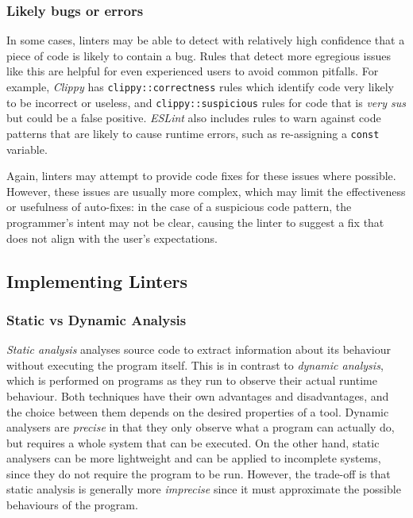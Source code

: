 \documentclass[../../main.tex]{subfiles}
\begin{document}
\subsubsection{Likely bugs or errors}
In some cases, linters may be able to detect with relatively high confidence that a piece of code is likely to contain a bug.
Rules that detect more egregious issues like this are helpful for even experienced users to avoid common pitfalls.
For example, \emph{Clippy} has \texttt{clippy::correctness} rules which identify code very likely to be incorrect or useless, and \texttt{clippy::suspicious} rules for code that is \emph{very sus} but could be a false positive.
\emph{ESLint} also includes rules to warn against code patterns that are likely to cause runtime errors, such as re-assigning a \texttt{const} variable.

Again, linters may attempt to provide code fixes for these issues where possible.
However, these issues are usually more complex, which may limit the effectiveness or usefulness of auto-fixes: in the case of a suspicious code pattern, the programmer's intent may not be clear, causing the linter to suggest a fix that does not align with the user's expectations.

\subsection{Implementing Linters}
\subsubsection{Static vs Dynamic Analysis}
\emph{Static analysis} analyses source code to extract information about its behaviour without executing the program itself.
This is in contrast to \emph{dynamic analysis}, which is performed on programs as they run to observe their actual runtime behaviour.
Both techniques have their own advantages and disadvantages, and the choice between them depends on the desired properties of a tool.
Dynamic analysers are \emph{precise} in that they only observe what a program can actually do, but requires a whole system that can be executed.
On the other hand, static analysers can be more lightweight and can be applied to incomplete systems, since they do not require the program to be run.
However, the trade-off is that static analysis is generally more \emph{imprecise} since it must approximate the possible behaviours of the program.
\end{document}
